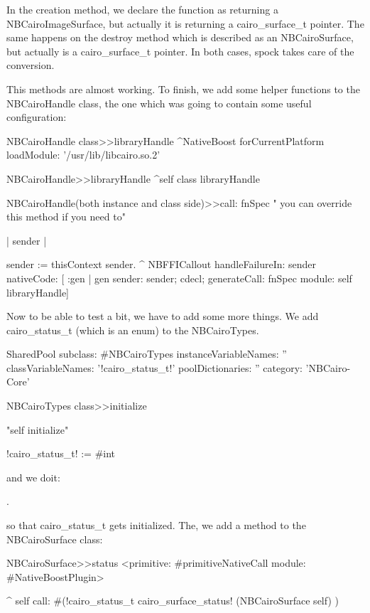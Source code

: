 \documentclass[a4paper,10pt,twoside]{book}
\begin{document}
In the creation method, we declare the function as returning a
NBCairoImageSurface, but actually it is returning a cairo\_surface\_t
pointer. The same happens on the destroy method which is described
as an NBCairoSurface, but actually is a cairo\_surface\_t pointer.
In both cases, spock takes care of the conversion.




This methods are almost working. To finish, we add some helper
functions to the NBCairoHandle class, the one which was going
to contain some useful configuration:

\begin{code}{}
NBCairoHandle class>>libraryHandle
	^NativeBoost forCurrentPlatform loadModule: '/usr/lib/libcairo.so.2'

NBCairoHandle>>libraryHandle
	^self class libraryHandle
	
NBCairoHandle(both instance and class side)>>call: fnSpec
	" you can override this method if you need to"

	| sender |
	
	sender := thisContext sender.
	^ NBFFICallout  
		handleFailureIn: sender
		nativeCode: [ :gen |
			gen
				sender: sender;
				cdecl;
				generateCall: fnSpec module: self libraryHandle]
\end{code}

Now to be able to test a bit, we have to add some more things. We add 
cairo\_status\_t (which is an enum) to the NBCairoTypes.

   
\begin{classdef}{}
SharedPool subclass: #NBCairoTypes
	instanceVariableNames: ''
	classVariableNames: '!cairo\_status\_t!'
	poolDictionaries: ''
	category: 'NBCairo-Core'
\end{classdef}

\begin{code}{}
NBCairoTypes class>>initialize

	"self initialize"
		
	!cairo\_status\_t! := #int
\end{code}

and we doit:

.

so that cairo\_status\_t gets initialized. The, we add a method to
the NBCairoSurface class:

\begin{code}{}
NBCairoSurface>>status
	<primitive: #primitiveNativeCall module: #NativeBoostPlugin>
	
	^ self call: #(!cairo\_status\_t cairo\_surface\_status! (NBCairoSurface self) )
\end{code}
\end{document}
